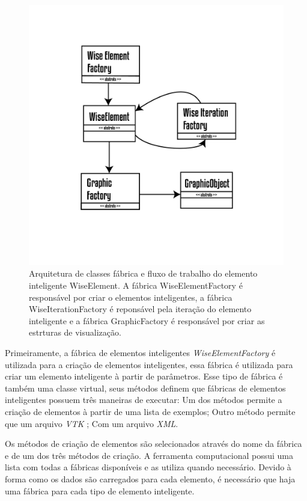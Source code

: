 \documentclass[a4paper,12pt]{monografia}
\theoremstyle{plain}
\theoremstyle{definition}
\theoremstyle{remark}
\begin{document}
\begin{figure}[!htbp]
	\centering
	\includegraphics[scale=1]{Figures/WiseElementWorkflow.png}
	\caption{Arquitetura de classes fábrica e fluxo de trabalho do elemento inteligente WiseElement. A fábrica WiseElementFactory é responsável por criar o elementos inteligentes, a fábrica WiseIterationFactory é reponsável pela iteração do elemento inteligente e a fábrica GraphicFactory é responsável por criar as estrturas de visualização. }
	\label{fig2:wiselementsworkflow}
\end{figure}

Primeiramente, a fábrica de elementos inteligentes \textit{WiseElementFactory} é utilizada para a criação de elementos inteligentes, essa fábrica é utilizada para criar um elemento inteligente à partir de parâmetros. Esse tipo de fábrica é também uma classe virtual, seus métodos definem que fábricas de elementos inteligentes possuem três maneiras de executar: Um dos métodos permite a criação de elementos à partir de uma lista de exemplos; Outro método permite que um arquivo \textit{VTK} ; Com um arquivo \textit{XML}. 

Os métodos de criação de elementos são selecionados através do nome da fábrica e de um dos três métodos de criação. A ferramenta computacional possui uma lista com todas a fábricas disponíveis e as utiliza quando necessário. Devido à forma como os dados são carregados para cada elemento, é necessário que haja uma fábrica para cada tipo de elemento inteligente.
\end{document}
